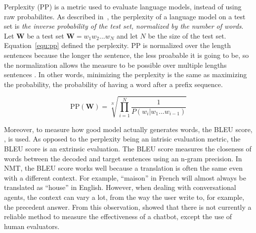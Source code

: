 Perplexity (PP) is a metric used to evaluate language models, instead of using raw probabilites. As described in~\citet{jurafsky2014speech}, the perplexity of a language model on a test set is \textit{the inverse probability of the test set, normalized by the number of words}. Let $\mathbf{W}$ be a test set $\mathbf{W}=w_1 w_2 ... w_N$ and let $N$ be the size of the test set. Equation~\ref{equ:pp} defined the perplexity.
PP is normalized over the length sentences because the longer the sentence, the less proabable it is going to be, so the normalization allows the measure to be possible over multiple lengths sentences \citep{nlp-jurasky-4.4}.
In other words, minimizing the perplexity is the same as maximizing the probability, the probability of having a word after a prefix sequence.

\begin{equation}
    \mathrm{PP}(\mathbf{W}) = \sqrt[N]{ \prod_{i=1}^N \frac{1}{P(w_i | w_1 ... w_{i-1})}  }
    \label{equ:pp}
\end{equation}

Moreover, to measure how good model actually generates words, the BLEU score, \citet{bleu-score}, is used. As opposed to the perplexity being an intrisic evaluation metric, the BLEU score is an extrinsic evaluation. The BLEU score measures the closeness of words between the decoded and target sentences using an n-gram precision.
In NMT, the BLEU score works well because a translation is often the same even with a different context. For example, ``maison'' in French will almost always be translated as ``house'' in English.
However, when dealing with conversational agents, the context can vary a lot, from the way the user write to, for example, the precedent answer. From this observation, \citet{1603.08023} showed that there is not currently a reliable method to measure the effectiveness of a chatbot, except the use of human evaluators.

